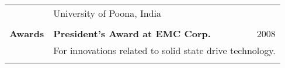\documentclass[10pt]{article}
\begin{document}
\begin{longtable}{p{ 90pt}p{299pt}r}
	              & {University of Poona, India} \\
\\
{\bf Awards}         & {\bf President's Award at EMC Corp.} & 2008 \\
                     & \multicolumn{2}{p{3.35in}}{For innovations related to solid state drive technology.}\\
\\

\end{longtable}
\end{document}
